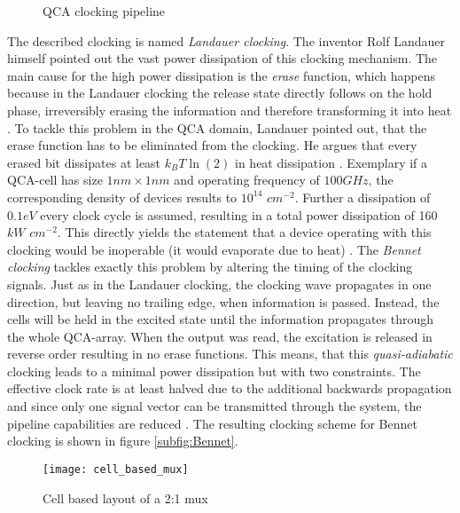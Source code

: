 
\begin{figure}
	\centering
	\caption{QCA clocking pipeline} \label{fig:QCAClockpipeline}
\end{figure}


The described clocking is named \textit{Landauer clocking}. The inventor Rolf Landauer himself pointed out the vast power dissipation of this clocking mechanism. The main cause for the high power dissipation is the \textit{erase} function, which happens because in the Landauer clocking the release state directly follows on the hold phase, irreversibly erasing the information and therefore transforming it into heat \cite{landauer1961irreversibility}. To tackle this problem in the QCA domain, Landauer pointed out, that the erase function has to be eliminated from the clocking. He argues that every erased bit dissipates at least $k_BT\ln(2)$ in heat dissipation \cite{keyes1970minimal}. Exemplary if a QCA-cell has size $1nm \times 1nm$ and operating frequency of $100 GHz$, the corresponding density of devices results to $10^{14}$ $cm^{-2}$. Further a dissipation of $0.1 eV$ every clock cycle is assumed, resulting in a total power dissipation of 160 $kW$ $cm^{-2}$. This directly yields the statement that a device operating with this clocking would be inoperable (it would evaporate due to heat) \cite{lent2006bennett}. The \textit{Bennet clocking} tackles exactly this problem by altering the timing of the clocking signals. Just as in the Landauer clocking, the clocking wave propagates in one direction, but leaving no trailing edge, when information is passed. Instead, the cells will be held in the excited state until the information propagates through the whole QCA-array. When the output was read, the excitation is released in reverse order resulting in no erase functions. This means, that this \textit{quasi-adiabatic} clocking leads to a minimal power dissipation but with two constraints. The effective clock rate is at least halved due to the additional backwards propagation and since only one signal vector can be transmitted through the system, the pipeline capabilities are reduced \cite{lent2006bennett}. The resulting clocking scheme for Bennet clocking is shown in figure \ref{subfig:Bennet}.\\
\begin{figure}
	\centering
	\texttt{[image: cell\_based\_mux]}
	\caption{Cell based layout of a 2:1 mux \cite{majeed2019optimal}}\label{fig:cell_based_mux}
\end{figure}
